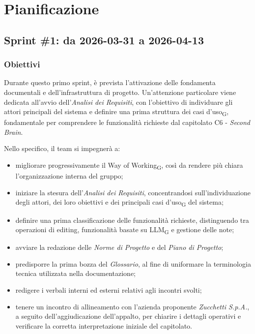 \documentclass[a4paper, 10pt, colorlinks=true, linkcolor=black, urlcolor=blue, citecolor=blue, hidelinks]{article}
\begin{document}
\section{Pianificazione}

\subsection{Sprint \#1: da 2026-03-31 a 2026-04-13}
\subsubsection{Obiettivi}
Durante questo primo sprint, è prevista l'attivazione delle fondamenta documentali e dell'infrastruttura di progetto. Un'attenzione particolare viene dedicata all'avvio dell'\textit{Analisi dei Requisiti}, con l'obiettivo di individuare gli attori principali del sistema e definire una prima struttura dei casi d'uso\textsubscript{G}, fondamentale per comprendere le funzionalità richieste dal capitolato C6 - \textit{Second Brain}.

Nello specifico, il team si impegnerà a:
\begin{itemize}
    \item migliorare progressivamente il Way of Working\textsubscript{G}, così da rendere più chiara l'organizzazione interna del gruppo;
    \item iniziare la stesura dell'\textit{Analisi dei Requisiti}, concentrandosi sull'individuazione degli attori, dei loro obiettivi e dei principali casi d'uso\textsubscript{G} del sistema;
    \item definire una prima classificazione delle funzionalità richieste, distinguendo tra operazioni di editing, funzionalità basate su LLM\textsubscript{G} e gestione delle note;
    \item avviare la redazione delle \textit{Norme di Progetto} e del \textit{Piano di Progetto};
    \item predisporre la prima bozza del \textit{Glossario}, al fine di uniformare la terminologia tecnica utilizzata nella documentazione;
    \item redigere i verbali interni ed esterni relativi agli incontri svolti;
    \item tenere un incontro di allineamento con l'azienda proponente \textit{Zucchetti S.p.A.}, a seguito dell'aggiudicazione dell'appalto, per chiarire i dettagli operativi e verificare la corretta interpretazione iniziale del capitolato.
\end{itemize}
\end{document}
